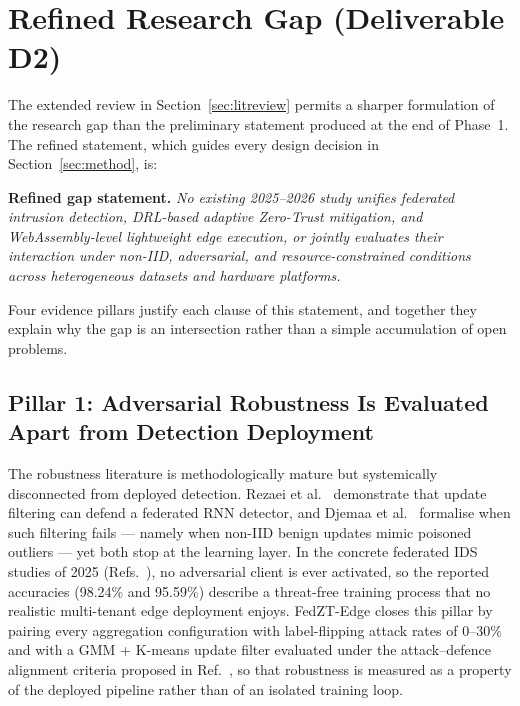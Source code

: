 \documentclass[11pt,a4paper]{article}
\newcommand{\bigsection}[1]{\Needspace*{0.22\textheight}\section{#1}}
\begin{document}
\bigsection{Refined Research Gap (Deliverable D2)}\label{sec:gap}

The extended review in Section~\ref{sec:litreview} permits a sharper
formulation of the research gap than the preliminary statement produced at
the end of Phase~1. The refined statement, which guides every design
decision in Section~\ref{sec:method}, is:

\begin{gapbox}
\textbf{Refined gap statement.} \emph{No existing 2025--2026 study unifies
federated intrusion detection, DRL-based adaptive Zero-Trust mitigation,
and WebAssembly-level lightweight edge execution, or jointly evaluates
their interaction under non-IID, adversarial, and resource-constrained
conditions across heterogeneous datasets and hardware platforms.}
\end{gapbox}

Four evidence pillars justify each clause of this statement, and together
they explain why the gap is an intersection rather than a simple
accumulation of open problems.

\subsection{Pillar 1: Adversarial Robustness Is Evaluated Apart from
Detection Deployment}\label{sec:gap1}

The robustness literature is methodologically mature but systemically
disconnected from deployed detection. Rezaei et al.~\cite{rezaei2025}
demonstrate that update filtering can defend a federated RNN detector, and
Djemaa et al.~\cite{djemaa2026} formalise when such filtering fails ---
namely when non-IID benign updates mimic poisoned outliers --- yet both
stop at the learning layer. In the concrete federated IDS studies of 2025
(Refs.~\cite{albogami2025,karunamurthy2025}), no adversarial client is ever
activated, so the reported accuracies (98.24\% and 95.59\%) describe a
threat-free training process that no realistic multi-tenant edge deployment
enjoys. FedZT-Edge closes this pillar by pairing every aggregation
configuration with label-flipping attack rates of 0--30\% and with a
GMM + K-means update filter evaluated under the attack--defence alignment
criteria proposed in Ref.~\cite{djemaa2026}, so that robustness is measured
as a property of the deployed pipeline rather than of an isolated training
loop.
\end{document}
